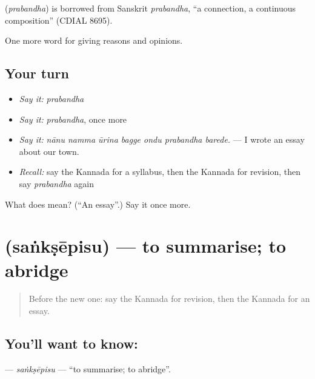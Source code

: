 \begin{cousinweb}
\textbf{} (\emph{prabandha}) is borrowed from Sanskrit \emph{prabandha}, \textquotedblleft{}a connection, a continuous composition\textquotedblright{} (CDIAL 8695).
\end{cousinweb}

\begin{grammarlens}[title={What you've built}]
One more word for giving reasons and opinions.
\end{grammarlens}

\subsection*{Your turn}
\begin{itemize}
\raggedright
  \item \emph{Say it:} \emph{prabandha}
  \item \emph{Say it:} \emph{prabandha}, once more
  \item \emph{Say it:} \emph{nānu namma ūrina bagge ondu prabandha barede.} — I wrote an essay about our town.
  \item \emph{Recall:} say the Kannada for a syllabus, then the Kannada for revision, then say \emph{prabandha} again
\end{itemize}

\begin{tcolorbox}[breakable,colback=teal!4,colframe=teal!35!black,title={Before you move on}]
What does  mean? (\textquotedblleft{}An essay\textquotedblright{}.) Say it once more.
\end{tcolorbox}
\section[\texorpdfstring{\kn{ಸಂಕ್ಷೇಪಿಸು} (saṅkṣēpisu)}{ಸಂಕ್ಷೇಪಿಸು (saṅkṣēpisu)}]{ (saṅkṣēpisu) — to summarise; to abridge}

\label{lesson:KA-C409-sanksepisu}



\begin{quote}
Before the new one: say the Kannada for revision, then the Kannada for an essay.
\end{quote}

\subsection*{You'll want to know: }
\textbf{} — \emph{saṅkṣēpisu} — \textquotedblleft{}to summarise; to abridge\textquotedblright{}.

